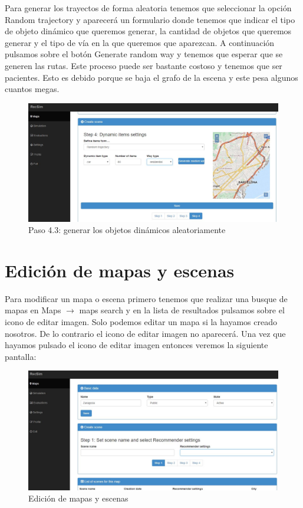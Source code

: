 Para generar los trayectos de forma aleatoria tenemos que seleccionar la opción Random trajectory y aparecerá un formulario donde tenemos que indicar el tipo de objeto dinámico que queremos generar, la cantidad de objetos que queremos generar y el tipo de vía en la que queremos que aparezcan. A continuación pulsamos sobre el botón Generate random way y tenemos que esperar que se generen las rutas. Este proceso puede ser bastante costoso y tenemos que ser pacientes. Esto es debido porque se baja el grafo de la escena y este pesa algunos cuantos megas.

\begin{figure}[H]
	\centering\includegraphics[scale=0.35]{imagenes/capitulo9/crear-escena-5.JPG}
	\caption{Paso 4.3: generar los objetos dinámicos aleatoriamente}
	\label{img:paso4-3}
\end{figure}

\section{Edición de mapas y escenas}

Para modificar un mapa o escena primero tenemos que realizar una busque de mapas en Maps $\rightarrow$ maps search y en la lista de resultados pulsamos sobre el icono de editar imagen. Solo podemos editar un mapa si la hayamos creado nosotros. De lo contrario el icono de editar imagen no aparecerá. Una vez que hayamos pulsado el icono de editar imagen entonces veremos la siguiente pantalla:

\begin{figure}[H]
	\centering\includegraphics[scale=0.35]{imagenes/capitulo10/capitulo10.jpg}
	\caption{Edición de mapas y escenas}
	\label{img:UpdateMapScene}
\end{figure}

